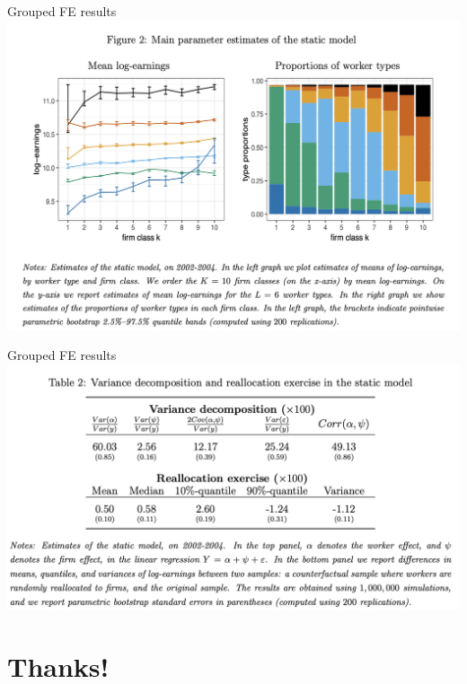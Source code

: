 \documentclass[xcolor=pdftex,dvipsnames,table,mathserif,aspectratio=169]{beamer}
\begin{document}
\begin{frame}{Grouped FE results}
\centering
\includegraphics[height=0.9\textheight]{./resources/grouped_fe1.png}
\end{frame}


\begin{frame}{Grouped FE results}
\centering
\includegraphics[height=0.9\textheight]{./resources/grouped_fe_table.png}
\end{frame}


\section{Thanks!}
\end{document}
